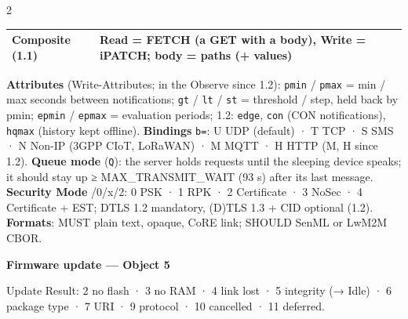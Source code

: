 \documentclass[8pt]{extarticle}
\newcommand\ct[1]{\texttt{#1}}
\begin{document}
\begin{multicols}{2}
{\begin{tabular}{@{}>{\raggedright\arraybackslash}p{19mm}>{\raggedright\arraybackslash}p{58mm}@{}}
Composite (1.1) & Read = FETCH (a GET with a body), Write = iPATCH; body = paths (+ values)\\
\bottomrule
\end{tabular}}\par
\textbf{Attributes} (Write-Attributes; in the Observe since 1.2): \ct{pmin} / \ct{pmax} = min /
max seconds between notifications; \ct{gt} / \ct{lt} / \ct{st} = threshold / step, held back by
pmin; \ct{epmin} / \ct{epmax} = evaluation periods; 1.2: \ct{edge}, \ct{con} (CON notifications),
\ct{hqmax} (history kept offline). \textbf{Bindings} \ct{b=}: U UDP (default) · T TCP · S SMS · N
Non-IP (3GPP CIoT, LoRaWAN) · M MQTT · H HTTP (M, H since 1.2). \textbf{Queue mode} (\ct{Q}): the
server holds requests until the sleeping device speaks; it should stay up ≥ MAX\_TRANSMIT\_WAIT
(93 s) after its last message. \textbf{Security Mode} /0/x/2: 0 PSK · 1 RPK · 2 Certificate · 3 NoSec · 4 Certificate +
EST; DTLS 1.2 mandatory, (D)TLS 1.3 + CID optional (1.2). \textbf{Formats}: MUST plain text,
opaque, CoRE link; SHOULD SenML or LwM2M CBOR.

\textbf{Firmware update — Object 5}\par
\noindent{}\par
Update Result: 2 no flash · 3 no RAM · 4 link lost · 5 integrity (→ Idle) · 6 package type · 7 URI
· 9 protocol · 10 cancelled · 11 deferred.


\end{multicols}
\end{document}
